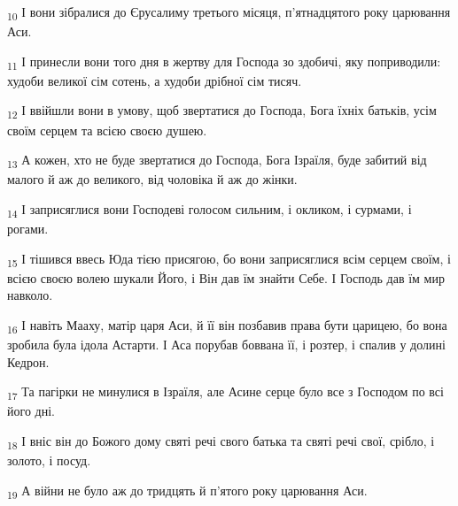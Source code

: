 \begin{tcolorbox}
\textsubscript{10} І вони зібралися до Єрусалиму третього місяця, п'ятнадцятого року царювання Аси.
\end{tcolorbox}
\begin{tcolorbox}
\textsubscript{11} І принесли вони того дня в жертву для Господа зо здобичі, яку поприводили: худоби великої сім сотень, а худоби дрібної сім тисяч.
\end{tcolorbox}
\begin{tcolorbox}
\textsubscript{12} І ввійшли вони в умову, щоб звертатися до Господа, Бога їхніх батьків, усім своїм серцем та всією своєю душею.
\end{tcolorbox}
\begin{tcolorbox}
\textsubscript{13} А кожен, хто не буде звертатися до Господа, Бога Ізраїля, буде забитий від малого й аж до великого, від чоловіка й аж до жінки.
\end{tcolorbox}
\begin{tcolorbox}
\textsubscript{14} І заприсяглися вони Господеві голосом сильним, і окликом, і сурмами, і рогами.
\end{tcolorbox}
\begin{tcolorbox}
\textsubscript{15} І тішився ввесь Юда тією присягою, бо вони заприсяглися всім серцем своїм, і всією своєю волею шукали Його, і Він дав їм знайти Себе. І Господь дав їм мир навколо.
\end{tcolorbox}
\begin{tcolorbox}
\textsubscript{16} І навіть Мааху, матір царя Аси, й її він позбавив права бути царицею, бо вона зробила була ідола Астарти. І Аса порубав боввана її, і розтер, і спалив у долині Кедрон.
\end{tcolorbox}
\begin{tcolorbox}
\textsubscript{17} Та пагірки не минулися в Ізраїля, але Асине серце було все з Господом по всі його дні.
\end{tcolorbox}
\begin{tcolorbox}
\textsubscript{18} І вніс він до Божого дому святі речі свого батька та святі речі свої, срібло, і золото, і посуд.
\end{tcolorbox}
\begin{tcolorbox}
\textsubscript{19} А війни не було аж до тридцять й п'ятого року царювання Аси.
\end{tcolorbox}

